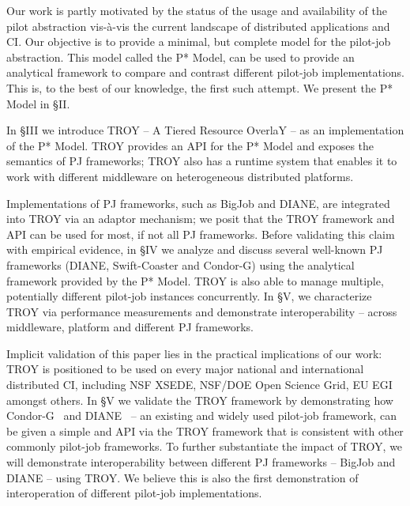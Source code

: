 \documentclass[conference,final]{IEEEtran}
\begin{document}


Our work is partly motivated by the status of the usage and
availability of the pilot abstraction vis-\`{a}-vis the current
landscape of distributed applications and CI. Our objective is to
provide a minimal, but complete model for the pilot-job abstraction.
This model called the P* Model, can be used to provide an analytical
framework to compare and contrast different pilot-job
implementations. This is, to the best of our knowledge, the first such
attempt. We present the P* Model in \S{II}.

In \S{III} we introduce TROY -- A Tiered Resource OverlaY -- as an
implementation of the P* Model. TROY provides an API for the P* Model
and exposes the semantics of PJ frameworks; TROY also has a runtime
system that enables it to work with different middleware on
heterogeneous distributed platforms.

Implementations of PJ frameworks, such as BigJob and DIANE, are
integrated into TROY via an adaptor mechanism; we posit that the TROY
framework and API can be used for most, if not all PJ frameworks.
Before validating this claim with empirical evidence, in \S{IV} we
analyze and discuss several well-known PJ frameworks (DIANE,
Swift-Coaster and Condor-G) using the analytical framework provided by
the P* Model.  TROY is also able to manage multiple, potentially
different pilot-job instances concurrently. In \S{V}, we characterize
TROY via performance measurements and demonstrate interoperability --
across middleware, platform and different PJ frameworks.

Implicit validation of this paper lies in the practical implications
of our work: TROY is positioned to be used on every major national and
international distributed CI, including NSF XSEDE, NSF/DOE Open
Science Grid, EU EGI amongst others. In \S{V} we validate the TROY
framework by demonstrating how Condor-G~\cite{condor-g} and
DIANE~\cite{Moscicki:908910} -- an existing and widely used pilot-job
framework, can be given a simple and API via the TROY framework that
is consistent with other commonly pilot-job frameworks. To further
substantiate the impact of TROY, we will demonstrate interoperability
between different PJ frameworks -- BigJob and DIANE -- using TROY. We
believe this is also the first demonstration of interoperation of
different pilot-job implementations.
\end{document}
